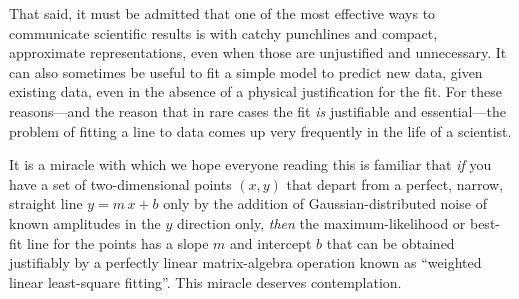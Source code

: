 \documentclass[12pt,twoside,pdftex]{article}
\begin{document}
That said, it must be admitted that one of the most effective ways to
communicate scientific results is with catchy punchlines and compact,
approximate representations, even when those are unjustified and
unnecessary.  It can also sometimes be useful to fit a simple model to
predict new data, given existing data, even in the absence of a
physical justification for the fit.  For these reasons---and the reason that in
rare cases the fit \emph{is} justifiable and essential---the problem
of fitting a line to data comes up very frequently in the life of a
scientist.

It is a miracle with which we hope everyone reading this is familiar
that \emph{if} you have a set of two-dimensional points $(x,y)$ that
depart from a perfect, narrow, straight line $y=m\,x+b$ only by the
addition of Gaussian-distributed noise of known amplitudes in the $y$
direction only, \emph{then} the maximum-likelihood or best-fit line
for the points has a slope $m$ and intercept $b$ that can be obtained
justifiably by a perfectly linear matrix-algebra operation known as
``weighted linear least-square fitting''.  This miracle deserves
contemplation.
\end{document}

